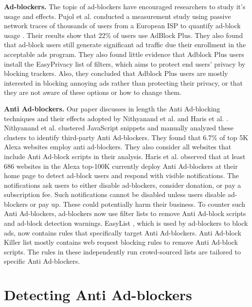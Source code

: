\documentclass[runningheads,a4paper]{llncs}
\begin{document}
\textbf{Ad-blockers.} The topic of ad-blockers have encouraged researchers to study it's usage and effects. Pujol et al. conducted a measurement study using passive network traces of thousands of users from a European ISP to quantify ad-block usage \cite{Pujol2015}. Their
results show that 22\% of users use AdBlock Plus. They
also found that ad-block users still generate significant
ad traffic due their enrollment in the acceptable
ads program. They also found little evidence that Adblock Plus users install the EasyPrivacy \cite{easyPrivacy} list of filters, which aims to protect end users’ privacy by blocking trackers. Also, they concluded that Adblock Plus users are mostly interested in blocking annoying ads rather than protecting their privacy, or that they are not aware of these options or how to change them.

\textbf{Anti Ad-blockers.} Our paper discusses in length the Anti Ad-blocking techniques and their effects adopted by Nithyanand et al. \cite{Rishab2016} and Haris et al. \cite{Haris2015}. Nithyanand et al. \cite{Rishab2016} clustered JavaScript snippets and manually analyzed these
clusters to identify third-party Anti Ad-blockers. They
found that 6.7\% of top 5K Alexa websites employ anti
ad-blockers. They also consider all websites that include Anti Ad-block scripts in their analysis. Haris et al. \cite{Haris2015} observed that at least 686 websites in the Alexa top-100K currently deploy Anti Ad-blockers at their home page to detect ad-block users and respond with visible notifications. The notifications ask users to either disable ad-blockers, consider donation, or pay a subscription fee. Such notifications cannot be disabled unless users disable ad-blockers or pay up. These could potentially harm their business. To counter such Anti Ad-blockers, ad-blockers now use filter lists to
remove Anti Ad-block scripts and ad-block detection
warnings. EasyList \cite{easyList}, which is used by ad-blockers to block ads, now contains rules that specifically target Anti Ad-blockers. Anti Ad-block Killer
list \cite{aakl} mostly contains web request blocking rules to remove Anti Ad-block scripts. The rules in these independently run crowd-sourced lists are tailored to specific Anti Ad-blockers.

\section{Detecting Anti Ad-blockers}
\end{document}
